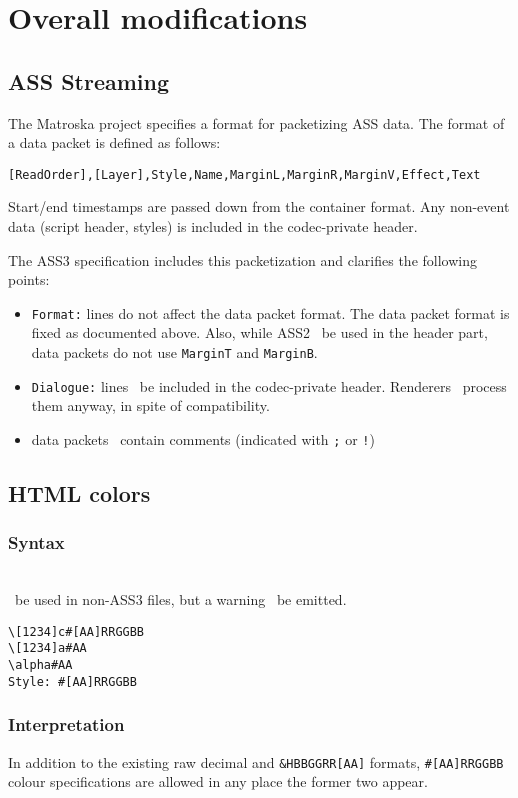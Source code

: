 \documentclass{spec}
\newcommand{\syntax}[1]{
	\subsubsection*{Syntax}
	\begin{tabbing}
	\hspace{2cm}\=\\[-16pt]
	#1
	\end{tabbing}
}
\newcommand{\mayuse}{\may\ be used in non-ASS3 files, but a warning \should\ be emitted.}
\begin{document}
\section{Overall modifications}
\subsection{ASS Streaming}
The Matroska project\cite{mkv} specifies a format for packetizing ASS data.
The format of a data packet is defined as follows:

\begin{verbatim}
[ReadOrder],[Layer],Style,Name,MarginL,MarginR,MarginV,Effect,Text
\end{verbatim}

Start/end timestamps are passed down from the container format. Any non-event
data (script header, styles) is included in the codec-private header.

The ASS3 specification includes this packetization and clarifies the following
points:
\begin{itemize}
\item \texttt{Format:} lines do not affect the data packet format.
The data packet format is fixed as documented above. Also, while ASS2 \may\ 
be used in the header part, data packets do not use \texttt{MarginT} and
\texttt{MarginB}.
\item \texttt{Dialogue:} lines \mustnot\ be included in the codec-private
header. Renderers \should\ process them anyway, in spite of compatibility.
\item data packets \mustnot\ contain comments (indicated with \verb!;! or
\verb;!;)
\end{itemize}

\subsection{HTML colors}
\syntax{\mayuse}

\begin{verbatim}
\[1234]c#[AA]RRGGBB
\[1234]a#AA
\alpha#AA
Style: #[AA]RRGGBB
\end{verbatim}

\subsubsection*{Interpretation}
In addition to the existing raw decimal and \verb!&HBBGGRR[AA]! formats,
\verb!#[AA]RRGGBB! colour specifications are allowed in any
place the former two appear.
\end{document}
